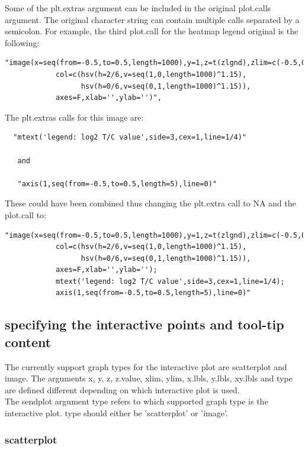 \documentclass[]{article}
\begin{document}
 Some of the plt.extras argument can be included in the original plot.calls argument. The original character string can contain multiple calls separated by a semicolon. For example, the third plot.call for the heatmap legend original is the following:
  
\begin{verbatim}
"image(x=seq(from=-0.5,to=0.5,length=1000),y=1,z=t(zlgnd),zlim=c(-0.5,0.5),
            col=c(hsv(h=2/6,v=seq(1,0,length=1000)^1.15),
                  hsv(h=0/6,v=seq(0,1,length=1000)^1.15)),
            axes=F,xlab='',ylab='')",
\end{verbatim}

The plt.extras calls for this image are: 
\begin{verbatim}
  "mtext('legend: log2 T/C value',side=3,cex=1,line=1/4)"
  
   and 

   "axis(1,seq(from=-0.5,to=0.5,length=5),line=0)"
\end{verbatim}


\indent These could have been combined thus changing the plt.extra call to NA and the plot.call to:
\begin{verbatim}
"image(x=seq(from=-0.5,to=0.5,length=1000),y=1,z=t(zlgnd),zlim=c(-0.5,0.5),
            col=c(hsv(h=2/6,v=seq(1,0,length=1000)^1.15),
                  hsv(h=0/6,v=seq(0,1,length=1000)^1.15)),
            axes=F,xlab='',ylab=''); 
            mtext('legend: log2 T/C value',side=3,cex=1,line=1/4);
            axis(1,seq(from=-0.5,to=0.5,length=5),line=0)"
\end{verbatim}


\subsection{specifying the interactive points and tool-tip content}


\indent The currently support graph types for the interactive plot are scatterplot and image. The arguments x, y, z, z.value, xlim, ylim, x.lbls, y.lbls, xy.lbls and type are defined different depending on which interactive plot is used. \\
\indent The sendplot argument type refers to which supported graph type is the interactive plot. type should either be 'scatterplot' or 'image'.

\subsubsection{scatterplot}
\end{document}
